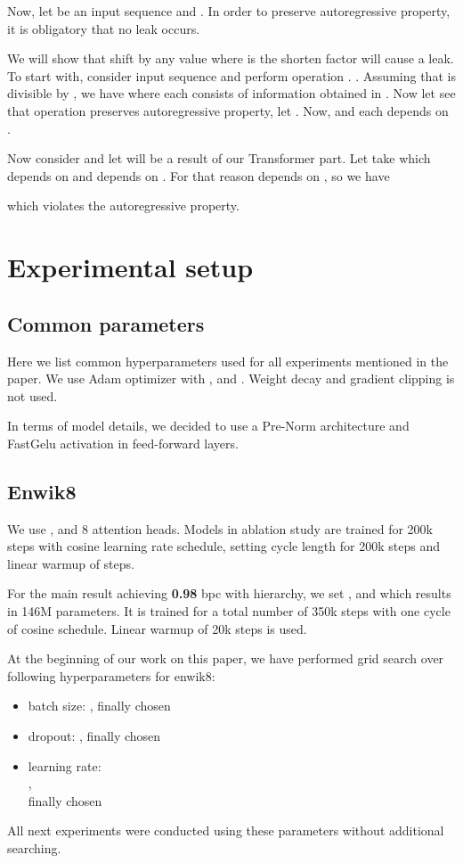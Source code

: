 \documentclass[11pt]{article}
\begin{document}
Now, let  be an input sequence and . In order to preserve autoregressive property, it is obligatory that no leak occurs.

We will show that shift by any value  where  is the shorten factor will cause a leak.\\
To start with, consider input sequence  and perform operation . . Assuming that  is divisible by , we have  where each  consists of information obtained in . Now let see that operation  preserves autoregressive property, let . Now,  and each  depends on . 

Now consider  and let  will be a result of our Transformer part. Let take  which depends on  and  depends on . For that reason  depends on ,
so we have
 
which violates the autoregressive property.

\section{Experimental setup}
\subsection{Common parameters}
Here we list common hyperparameters used for all experiments mentioned in the paper. We use Adam optimizer with ,  and . Weight decay and gradient clipping is not used.

In terms of model details, we decided to use a Pre-Norm architecture and FastGelu activation in feed-forward layers. 

\subsection{Enwik8}
We use ,  and 8 attention heads. Models in ablation study are trained for 200k steps with cosine learning rate schedule, setting cycle length for 200k steps and linear warmup of  steps. 

For the main result achieving \textbf{0.98} bpc with  hierarchy, we set ,  and  which results in 146M parameters. It is trained for a total number of 350k steps with one cycle of cosine schedule. Linear warmup of 20k steps is used.

At the beginning of our work on this paper, we have performed grid search over following hyperparameters for enwik8:
\begin{itemize}
    \item batch size: , finally chosen 
    \item dropout: , finally chosen  
    \item learning rate:\\ ,\\ finally chosen 
\end{itemize}
All next experiments were conducted using these parameters without additional searching.
\end{document}
